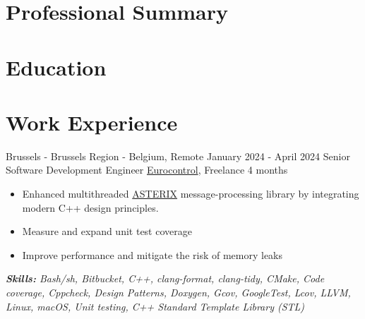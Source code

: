 \documentclass[11pt,a4paper,roman]{moderncv}
\begin{document}
\makecvtitle
\vspace{-2.5\baselineskip}

\section{Professional Summary}

\section{Education}

\section{Work Experience}


\cventry
{Brussels - Brussels Region - Belgium, Remote}
{January 2024 - April 2024}
{Senior Software Development Engineer}
{\href{https://www.eurocontrol.int/}{Eurocontrol}, Freelance}
{4 months}
{}
{
\begin{itemize}
	\item Enhanced multithreaded \href{https://www.eurocontrol.int/asterix}{ASTERIX} message-processing library by integrating modern C++ design principles.
   \item Measure and expand unit test coverage
   \item Improve performance and mitigate the risk of memory leaks
\end{itemize}

{\textcolor{color2}{\textit{\textbf{Skills:}
	Bash/sh,
	Bitbucket,
	C++,
	clang-format,
	clang-tidy,
	CMake,
	Code coverage,
	Cppcheck,
	Design Patterns,
	Doxygen,
	Gcov,
	GoogleTest,
	Lcov,
	LLVM,
	Linux,
	macOS,
	Unit testing,
	C++ Standard Template Library (STL)
	\newline
}}}}
\end{document}
